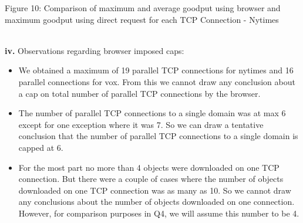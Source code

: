 \documentclass[12pt]{article}
\begin{document}
{
\begin{center}Figure 10: Comparison of maximum and average goodput using browser and maximum goodput using direct request for each TCP Connection - Nytimes\end{center}
}
~\\
\textbf{iv.} Observations regarding browser imposed caps:
\begin{itemize}
\item We obtained a maximum of 19 parallel TCP connections for nytimes and 16 parallel connections for vox. From this we cannot draw any conclusion about a cap on total number of parallel TCP connections by the browser. 
\item The number of parallel TCP connections to a single domain was at max 6 except for one exception where it was 7. So we can draw a tentative conclusion that the number of parallel TCP connections to a single domain is capped at 6.
\item For the most part no more than 4 objects were downloaded on one TCP connection. But there were a couple of cases where the number of objects downloaded on one TCP connection was as many as 10. So we cannot draw any conclusions about the number of objects downloaded on one connection. However, for comparison purposes in Q4, we will assume this number to be 4. 
\end{itemize}
\end{document}
